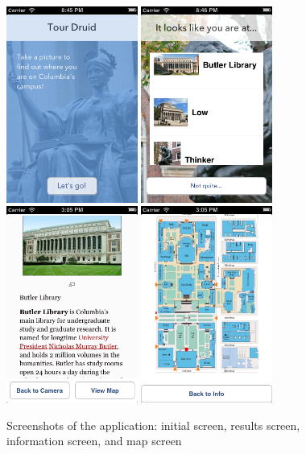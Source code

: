 \begin{figure}
\includegraphics[width=43mm]{app1.png}
\includegraphics[width=43mm]{app2.png}
\includegraphics[width=43mm]{app4.png}
\includegraphics[width=43mm]{app5.png}
\caption{Screenshots of the application: initial screen, results screen, information screen, and map screen}
\end{figure}
